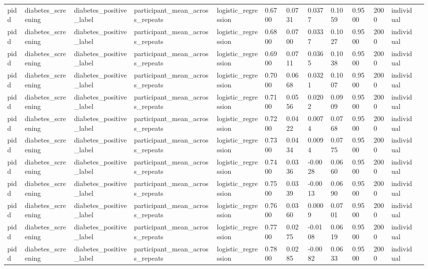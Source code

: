 \begin{tabular}{lllllllllllll}
pidd & diabetes\_screening & diabetes\_positive\_label & participant\_mean\_across\_repeats & logistic\_regression & 0.6700 & 0.0731 & 0.0377 & 0.1059 & 0.9500 & 2000 & individual &  \\
pidd & diabetes\_screening & diabetes\_positive\_label & participant\_mean\_across\_repeats & logistic\_regression & 0.6800 & 0.0700 & 0.0337 & 0.1027 & 0.9500 & 2000 & individual &  \\
pidd & diabetes\_screening & diabetes\_positive\_label & participant\_mean\_across\_repeats & logistic\_regression & 0.6900 & 0.0711 & 0.0365 & 0.1038 & 0.9500 & 2000 & individual &  \\
pidd & diabetes\_screening & diabetes\_positive\_label & participant\_mean\_across\_repeats & logistic\_regression & 0.7000 & 0.0668 & 0.0321 & 0.1007 & 0.9500 & 2000 & individual &  \\
pidd & diabetes\_screening & diabetes\_positive\_label & participant\_mean\_across\_repeats & logistic\_regression & 0.7100 & 0.0556 & 0.0202 & 0.0909 & 0.9500 & 2000 & individual &  \\
pidd & diabetes\_screening & diabetes\_positive\_label & participant\_mean\_across\_repeats & logistic\_regression & 0.7200 & 0.0422 & 0.0074 & 0.0768 & 0.9500 & 2000 & individual &  \\
pidd & diabetes\_screening & diabetes\_positive\_label & participant\_mean\_across\_repeats & logistic\_regression & 0.7300 & 0.0434 & 0.0094 & 0.0775 & 0.9500 & 2000 & individual &  \\
pidd & diabetes\_screening & diabetes\_positive\_label & participant\_mean\_across\_repeats & logistic\_regression & 0.7400 & 0.0336 & -0.0028 & 0.0660 & 0.9500 & 2000 & individual &  \\
pidd & diabetes\_screening & diabetes\_positive\_label & participant\_mean\_across\_repeats & logistic\_regression & 0.7500 & 0.0339 & -0.0013 & 0.0690 & 0.9500 & 2000 & individual &  \\
pidd & diabetes\_screening & diabetes\_positive\_label & participant\_mean\_across\_repeats & logistic\_regression & 0.7600 & 0.0360 & 0.0009 & 0.0701 & 0.9500 & 2000 & individual &  \\
pidd & diabetes\_screening & diabetes\_positive\_label & participant\_mean\_across\_repeats & logistic\_regression & 0.7700 & 0.0275 & -0.0108 & 0.0619 & 0.9500 & 2000 & individual &  \\
pidd & diabetes\_screening & diabetes\_positive\_label & participant\_mean\_across\_repeats & logistic\_regression & 0.7800 & 0.0285 & -0.0082 & 0.0633 & 0.9500 & 2000 & individual &  \\

\end{tabular}
